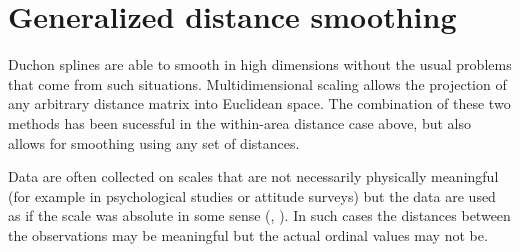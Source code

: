 \section{Generalized distance smoothing}
\label{gds-gds-examples}

Duchon splines are able to smooth in high dimensions without the usual problems that come from such situations. Multidimensional scaling allows the projection of any arbitrary distance matrix into Euclidean space. The combination of these two methods has been sucessful in the within-area distance case above, but also allows for smoothing using any set of distances.

Data are often collected on scales that are not necessarily physically meaningful (for example in psychological studies or attitude surveys) but the data are used as if the scale was absolute in some sense (\cite{cox2007}, \cite{torgerson}). In such cases the distances between the observations may be meaningful but the actual ordinal values may not be.

